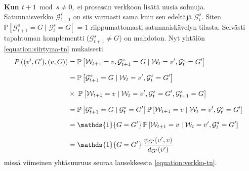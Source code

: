 \documentclass[finnish, 12pt, a4paper, sci, utf8, pdfa]{aaltothesis}
\newcommand{\Grandom}{\mathcal{G}}
\newcommand{\Wrandom}{\mathcal{W}}
\newcommand{\indicator}{\mathopen{\mathds{1}}}
\newcommand*{\prob}{\mathbb{P}}
\begin{document}
{\parindent0pt
\textbf{Kun $ t + 1 \bmod s \neq 0, $} ei prosessin verkkoon lisätä uusia solmuja. Satunnaisverkko $ \Grandom^{s}_{t+1} $ on siis varmasti sama kuin sen edeltäjä $ \Grandom^{s}_{t} $. Siten
$ \prob \left[ \Grandom^{s}_{t+1} = G \mid \Grandom^{s}_{t} = G \right] = 1 $
riippumattomasti satunnaiskävelyn tilasta. Selvästi tapahtuman komplementti ($ \Grandom^{s}_{t+1} \neq G $) on mahdoton. Nyt yhtälön \ref{equation:siirtyma-tn} mukaisesti
\begin{equation*}
   \setlength{\jot}{10pt}
   \begin{aligned}
   P\left( (v', G'), (v, G) \right) &= \prob \left[ \Wrandom_{t+1} = v, \Grandom^{s}_{t+1} = G \mid \Wrandom_{t} = v', \Grandom^{s}_{t} = G' \right] \\
   &= \prob \left[ \Grandom^{s}_{t+1} = G \mid \Wrandom_{t} = v', \Grandom^{s}_{t} = G' \right] \\
   &\times \; \prob \left[ \Wrandom_{t+1} = v \mid \Wrandom_{t} = v', \Grandom^{s}_{t} = G', \Grandom^{s}_{t+1} = G \right] \\
   &= \prob \left[ \Grandom^{s}_{t+1} = G \mid \Grandom^{s}_{t} = G' \right] \prob \left[ \Wrandom_{t+1} = v \mid \Wrandom_{t} = v', \Grandom^{s}_{t} = G' \right] \\
   &= \indicator \left\{ G = G' \right\} \prob \left[ \Wrandom_{t+1} = v \mid \Wrandom_{t} = v', \Grandom^{s}_{t} = G' \right] \\
   &= \indicator \left\{ G = G' \right\} \frac{\psi_{G'}(v', v)}{d_{G'}(v')}
   \end{aligned}
\end{equation*}
missä viimeinen yhtäsuuruus seuraa lausekkeesta \ref{equation:verkko-tn}.

\vspace{0.5cm}

}
\end{document}
